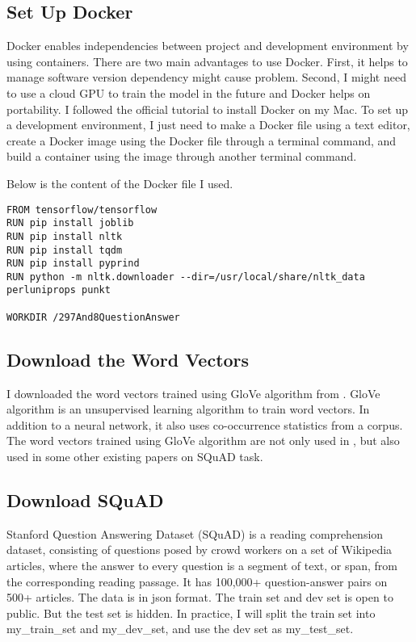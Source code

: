 \documentclass[12pt]{article}
\begin{document}
\subsection{Set Up Docker}

Docker enables independencies between project and development environment by using containers. There are two main advantages to use Docker. First, it helps to manage software version dependency might cause problem. Second, I might need to use a cloud GPU to train the model in the future and Docker helps on portability. I followed the official tutorial to install Docker on my Mac. To set up a development environment, I just need to make a Docker file using a text editor, create a Docker image using the Docker file through a terminal command, and build a container using the image through another terminal command.

Below is the content of the Docker file I used.

\begin{verbatim}
FROM tensorflow/tensorflow
RUN pip install joblib
RUN pip install nltk
RUN pip install tqdm
RUN pip install pyprind
RUN python -m nltk.downloader --dir=/usr/local/share/nltk_data perluniprops punkt

WORKDIR /297And8QuestionAnswer

\end{verbatim}

\subsection{Download the Word Vectors}

I downloaded the word vectors trained using GloVe algorithm\cite{pennington2014glove} from \cite{glove}. GloVe algorithm is an unsupervised learning algorithm to train word vectors. In addition to a neural network, it also uses co-occurrence statistics from a corpus. The word vectors trained using GloVe algorithm are not only used in \cite{wang2016machine}, but also used in some other existing papers on SQuAD task.

\subsection{Download SQuAD}


Stanford Question Answering Dataset (SQuAD) is a reading comprehension dataset, consisting of questions posed by crowd workers on a set of Wikipedia articles, where the answer to every question is a segment of text, or span, from the corresponding reading passage. It has 100,000+ question-answer pairs on 500+ articles. The data is in json format. The train set and dev set is open to public. But the test set is hidden. In practice, I will split the train set into my\_train\_set and my\_dev\_set, and use the dev set as my\_test\_set.
\end{document}
